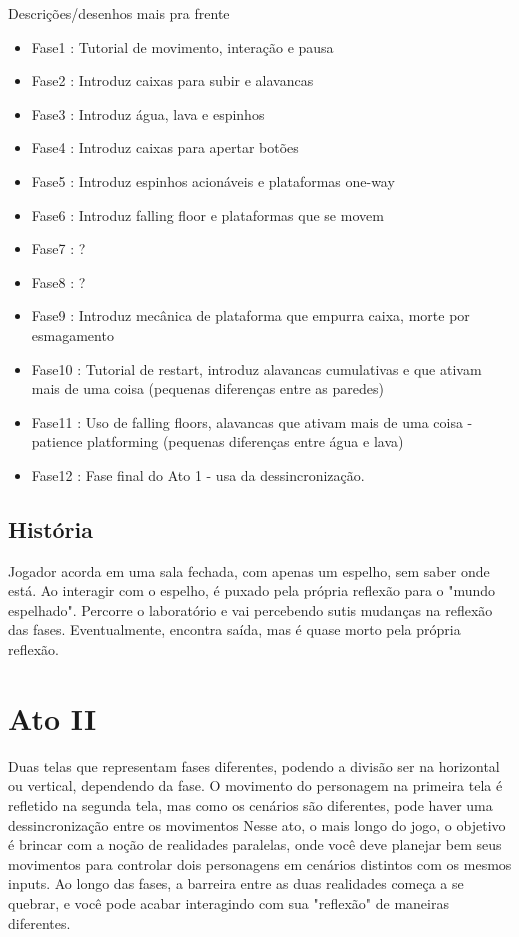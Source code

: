 \documentclass[a4paper, 11pt]{article}
\begin{document}
\begin{itemize}
	Descrições/desenhos mais pra frente 
	\begin{itemize} 
		\item Fase1 : Tutorial de movimento, interação e pausa 
		\item Fase2 : Introduz caixas para subir e alavancas
		\item Fase3 : Introduz água, lava e espinhos
		\item Fase4 : Introduz caixas para apertar botões
		\item Fase5 : Introduz espinhos acionáveis e plataformas one-way
		\item Fase6 : Introduz falling floor e plataformas que se movem
		\item Fase7 : ?
		\item Fase8 : ?
		\item Fase9 : Introduz mecânica de plataforma que empurra caixa, morte por esmagamento
		\item Fase10 : Tutorial de restart, introduz alavancas cumulativas e que ativam mais de uma coisa (pequenas diferenças entre as paredes)
		\item Fase11 : Uso de falling floors, alavancas que ativam mais de uma coisa - patience platforming (pequenas diferenças entre água e lava)
		\item Fase12 : Fase final do Ato 1 - usa da dessincronização.
	\end{itemize} 
 
\subsection{História} 
 
	Jogador acorda em uma sala fechada, com apenas um espelho, sem saber onde está. Ao interagir com o espelho, é puxado pela própria reflexão para o "mundo espelhado".
	Percorre o laboratório e vai percebendo sutis mudanças na reflexão das fases. Eventualmente, encontra saída, mas é quase morto pela própria reflexão.

\section{Ato II} 
 
	Duas telas que representam fases diferentes, podendo a divisão ser na horizontal ou vertical, dependendo da fase. 
	O movimento do personagem na primeira tela é refletido na segunda tela, mas como os cenários são diferentes, pode 
	haver uma dessincronização entre os movimentos 
	Nesse ato, o mais longo do jogo, o objetivo é brincar com a noção de realidades paralelas, onde você deve planejar 
	bem seus movimentos para controlar dois personagens em cenários distintos com os mesmos inputs. Ao longo das fases, 
	a barreira entre as duas realidades começa a se quebrar, e você pode acabar interagindo com sua "reflexão" de  
	maneiras diferentes. 
 

\end{itemize}
\end{document}
